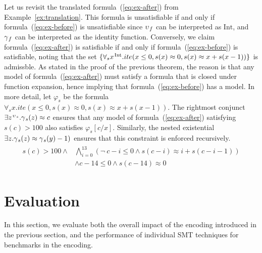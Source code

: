 \documentclass[runningheads,a4paper]{llncs}
\let\oldneg=\neg
\def\neg{\oldneg\:}
\newcommand{\teq}{\approx}
\newcommand{\I}{\mathcalx{J}} %
\newcommand{\sortint}{\mathrm{Int}}
\newcommand\concret{\gamma} %
\newcommand{\farg}[1]{\concret_{\vthinspace#1}}
\newcommand{\fargsort}[1]{\upsilon_{\vthinspace#1}}
\newcommand{\vthinspace}{\kern+0.083333em}
\newcommand{\typ}[1]{^{\vthinspace #1}}
\begin{document}
Let us revisit the translated formula~(\ref{eq:ex-after}) from Example~\ref{ex:translation}.
This formula is unsatisfiable if and only if formula~(\ref{eq:ex-before}) is unsatisfiable since $\fargsort{f}$ can be interpreted as $\sortint$,
and $\farg{f}$ can be interpreted as the identity function.
Conversely, we claim formula~(\ref{eq:ex-after}) is satisfiable if and only if formula~(\ref{eq:ex-before}) is satisfiable,
noting that the set $\{ \forall_{s} x\typ{\sortint}. ite( x \leq 0, s(x) \teq 0, s( x ) \teq x + s( x-1 ) ) \}$ is admissble.
As stated in the proof of the previous theorem, 
the reason is that any model of formula~(\ref{eq:ex-after}) must satisfy a formula that is closed under function expansion,
hence implying that formula~(\ref{eq:ex-before}) has a model.
In more detail, let $\varphi_s$ be the formula $\forall_{s} x. ite( x \leq 0, s(x) \teq 0, s( x ) \teq x + s( x-1 ) )$.
The rightmost conjunct 
$\exists z\typ{\fargsort{s}}. \farg{s}( z ) \teq c$ ensures 
that any model of formula~(\ref{eq:ex-after}) satisfying $s( c ) > 100$ also satisfies $\varphi_s[c/x]$.
Similarly, the nested existential $\exists z. \farg{s}( z ) \teq \farg{s}( y )-1 )$
ensures that this constraint is enforced recursively.
\begin{eqnarray}
\begin{split}
s( c ) > 100 \wedge & \displaystyle\bigwedge\limits_{i=0}^{13} ( \neg c-i \leq 0 \wedge s( c-i ) \teq i + s( c-i-1 ) ) \\
                    & \wedge c-14 \leq 0 \wedge s( c-14 ) \teq 0
\end{split}
\end{eqnarray}

\section{Evaluation}
\label{sec:evaluation}

In this section, we evaluate both 
the overall impact of the encoding introduced in the previous section, and
the performance of individual SMT techniques for benchmarks in the encoding.
\end{document}
